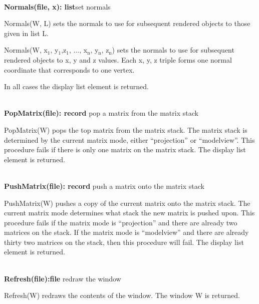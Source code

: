 \documentclass[letterpaper]{article}
\newcommand\textsubscript[1]{\ensuremath{{}_{\text{#1}}}}
\begin{document}
\noindent\hrulefill\\
\noindent\textsf{\textbf{Normals(file, x): list}}\hfill set normals

{
\textsf{Normals(W, L)} sets the normals to use for subsequent rendered objects to those given in list L.}

{
\textsf{Normals(W, x}\textsf{\textsubscript{1}}\textsf{,
y}\textsf{\textsubscript{1}}\textsf{,z}\textsf{\textsubscript{1}}\textsf{, ..., x}\textsf{\textsubscript{n}}\textsf{,
y}\textsf{\textsubscript{n}}\textsf{, z}\textsf{\textsubscript{n}}\textsf{) }sets the normals to use for subsequent
rendered objects to x, y and z values. Each x, y, z triple forms one normal coordinate that corresponds to one
vertex.}

{
In all cases the display list element is returned.}

\noindent\hrulefill\\
\noindent\textsf{\textbf{PopMatrix(file): record}}
\hfill pop a matrix from the matrix stack


\bigskip

\textsf{PopMatrix(W)} pops the top matrix from the matrix stack. The matrix stack is determined by the current matrix
mode, either \textsf{{}``projection''} or \textsf{{}``modelview''.} This procedure fails if there is only one matrix on
the matrix stack. The display list element is returned.

\noindent\hrulefill\\
\noindent\textsf{\textbf{PushMatrix(file): record}}
\hfill push a matrix onto the matrix stack


\bigskip

{
\textsf{PushMatrix(W)} pushes a copy of the current matrix onto the matrix stack. The current matrix mode determines
what stack the new matrix is pushed upon. This procedure fails if the matrix mode is \textsf{{}``projection''} and
there are already two matrices on the stack. If the matrix mode is \textsf{{}``modelview''} and there are already
thirty two matrices on the stack, then this procedure will fail. The display list element is returned.}

\noindent\hrulefill\\
\noindent\textsf{\textbf{Refresh(file):file}} \hfill redraw the window


\bigskip

\textsf{Refresh(W)} redraws the contents of the window.
The window W is returned.
\end{document}
